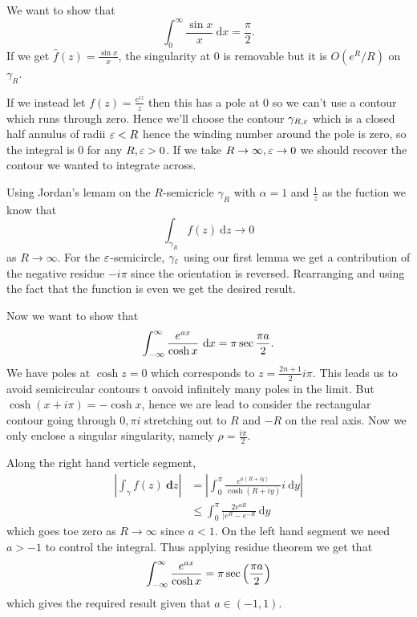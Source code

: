 \documentclass{article}
\begin{document}
\begin{example}
  We want to show that
  \[
	  \int_0^\infty  \frac{\sin x}x \ \mathrm dx = \frac \pi 2.
  \]
  If we get $ \hat f(z) = \frac{\sin x}x $, the singularity at $ 0 $ is removable but it is $ O(e^R/R) $ on $ \gamma_R $.\par
  If we instead let $ f(z) = \frac{e^{iz}}z $ then this has a pole at $ 0 $ so we can't use a contour which runs through zero. Hence we'll choose the contour $ \gamma_{R,\varepsilon} $ which is a closed half annulus of radii $ \varepsilon < R $ hence the winding number around the pole is zero, so the integral is $ 0 $ for any $ R,\varepsilon >0 $. If we take $ R\to\infty,\varepsilon \to 0 $ we should recover the contour we wanted to integrate across.\par
  Using Jordan's lemam on the $ R $-semicricle $ \gamma_R $ with $ \alpha = 1 $ and $ \frac 1z $ as the fuction we know that 
  \[
	  \int_{\gamma_R}f(z) \ \mathrm dz \to 0
  \]
  as $ R\to \infty $. For the $ \varepsilon $-semicircle, $ \gamma_\varepsilon $ using our first lemma we get a contribution of the negative residue $ -i\pi $ since the orientation is reversed. Rearranging and using the fact that the function is even we get the desired result.
\end{example}
\begin{example}
  Now we want to show that
  \[
	  \int_{-\infty}^\infty \frac{e^{ax}}{\cosh x} \ \mathrm dx = \pi \sec{ \frac{\pi a}2}.
  \]
  We have poles at $ \cosh z = 0 $ which corresponds to $ z =\frac{2n+1}2 i\pi $. This leads us to avoid semicircular contours t oavoid infinitely many poles in the limit. But $ \cosh(x + i\pi) = -\cosh x $, hence we are lead to consider the rectangular contour going through $ 0,\pi i$ stretching out to $ R $ and $ -R $ on the real axis. Now we only enclose a singular singularity, namely $ \rho = \frac {i\pi }2 $.\par
  Along the right hand verticle segment,
  \begin{align*}
	  \left|\int_{\gamma}f(z) \ \mathbf dz\right| &= \left|\int_0^\pi \frac{e^{a(R+iy)}}{\cosh(R+iy)} i \ \mathrm dy \right| \\
						      &\le \int_0^\pi \frac{2e^{aR}}{|e^R-e^{-R}} \ \mathrm dy
  \end{align*}
  which goes toe zero as $ R\to\infty $ since $ a<1 $. On the left hand segment we need $ a>-1 $ to control the integral. Thus applying residue theorem we get that
  \[
	  \int_{-\infty}^\infty\frac{e^{ax}}{\cosh x} = \pi \sec\left(\frac{\pi a}2\right)
  \]
  which gives the required result given that $ a\in (-1,1) $.
\end{example}
\end{document}
